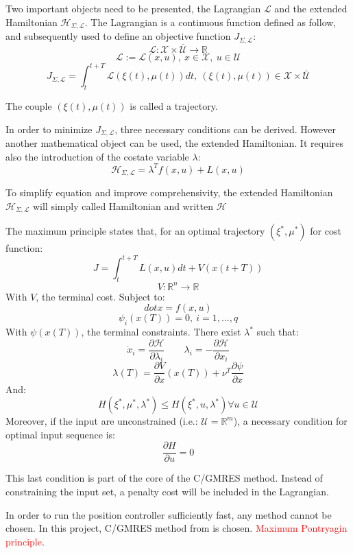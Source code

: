 \documentclass[a4paper, 12pt]{report}
\begin{document}
Two important objects need to be presented, the Lagrangian $\mathcal{L}$ and the extended Hamiltonian $\mathcal{H}_{\Sigma,\mathcal{L}}$. The Lagrangian is a continuous function defined as follow, and subsequently used to define an objective function $J_{\Sigma,\mathcal{L}}$:
\[ \mathcal{L}: \mathcal{X} \times \bar{\mathcal{U}} \rightarrow \mathbb{R} \]
\[ \mathcal{L}:= \mathcal{L}(x, u),\ x \in \mathcal{X},\ u \in \mathcal{U} \]
\[ J_{\Sigma,\mathcal{L}} = \int_{t}^{t+T} \mathcal{L}(\xi(t), \mu(t))dt, \ (\xi(t), \mu(t)) \in  \mathcal{X} \times \bar{\mathcal{U}}\]

The couple $(\xi(t), \mu(t))$ is called a trajectory.

In order to minimize  $J_{\Sigma,\mathcal{L}}$, three necessary conditions can be derived. However another mathematical object can be used, the extended Hamiltonian. It requires also the introduction of the costate variable $\lambda$:
\[ \mathcal{H}_{\Sigma,\mathcal{L}} = \lambda^Tf(x,u) + L(x,u) \]

To simplify equation and improve comprehensivity, the extended Hamiltonian $\mathcal{H}_{\Sigma,\mathcal{L}}$ will simply called Hamiltonian and written $\mathcal{H}$

The maximum principle states that, for an optimal trajectory $(\xi^*, \mu^*)$ for cost function:
\[ J = \int_t^{t+T} L(x,u)dt + V(x(t+T)) \]
\[ V: \mathbb{R}^n \rightarrow \mathbb{R} \]
With $V$, the terminal cost. Subject to:
\[ dot x = f(x,u) \]
\[ \psi_i(x(T)) = 0,\ i = 1, ..., q \]
With $\psi(x(T))$, the terminal constraints. There exist $\lambda^*$ such that:
\[ \dot x_i = \frac{\partial \mathcal{H}}{\partial \lambda_i} \qquad \lambda_i  = - \frac{\partial \mathcal{H}}{\partial x_i}\]
\[ \lambda(T) = \frac{\partial V}{\partial x}(x(T)) + \nu^T \frac{\partial \psi}{\partial x} \]
And:
\[ H(\xi^*, \mu^*, \lambda^*) \leq H(\xi^*, u, \lambda^*) \forall u \in \mathcal{U} \]
Moreover, if the input are unconstrained (i.e.: $\mathcal{U}=\mathbb{R}^m$), a necessary condition for optimal input sequence is:
\[ \frac{\partial H}{\partial u} = 0 \]

This last condition is part of the core of the C/GMRES method. Instead of constraining the input set, a penalty cost will be included in the Lagrangian.

In order to run the position controller sufficiently fast, any method cannot be chosen. In this project, C/GMRES method from \cite{Ohtsuka2004} is chosen.  \textcolor{red}{Maximum Pontryagin principle}.
\end{document}
